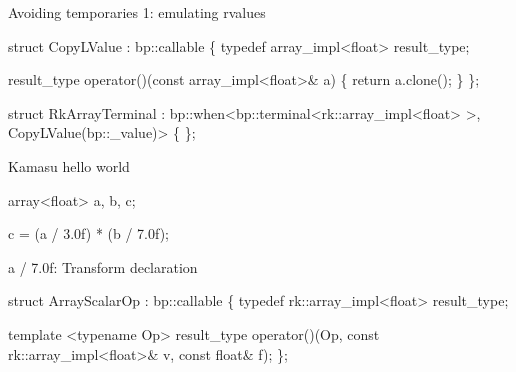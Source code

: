 \documentclass[9pt]{beamer}
\begin{document}

\begin{frame}[fragile]{Avoiding temporaries 1: emulating rvalues}
\begin{semiverbatim}
struct \alert<2>{CopyLValue} : bp::callable
\{
  typedef array_impl<float> result_type;

  result_type
  operator()(const array_impl<float>& a)
  \{
    return a.clone();
  \}
\};


struct RkArrayTerminal 
  : bp::when<bp::terminal<rk::array_impl<float> >, 
             CopyLValue(bp::_value)>
\{ \};


\end{semiverbatim}
\note{

}
\end{frame}


\begin{frame}[fragile]{Kamasu hello world}
\begin{semiverbatim}

array<float> a, b, c;

\alert<2>{c = (a / 3.0f) * (b / 7.0f);}

\end{semiverbatim}
\note{

}
\end{frame}

\begin{frame}[fragile]{a / 7.0f:  Transform declaration}
\begin{semiverbatim}

struct ArrayScalarOp : bp::callable
\{
  typedef rk::array_impl<float> result_type;

  template <typename Op>
  result_type 
  operator()(Op, const rk::array_impl<float>& v, const float& f);
\};


\end{semiverbatim}
\end{frame}
\end{document}
